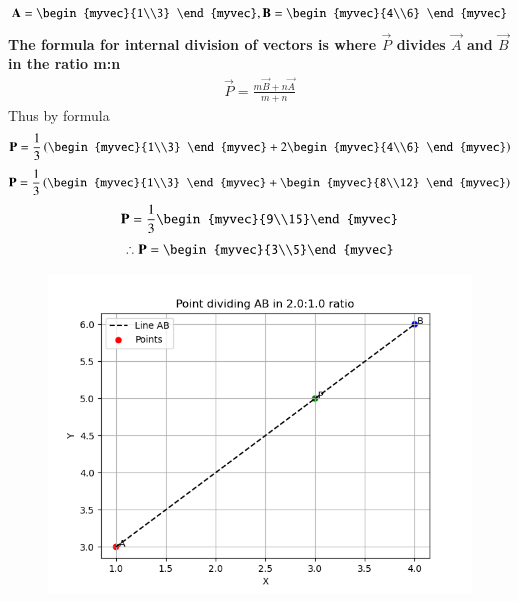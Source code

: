 \documentclass[journal]{IEEEtran}
\begin{document}
	\begin{align*}
		\vec{A} = \begin{myvec}{1\\3} \end{myvec} , \vec{B} = \begin{myvec}{4\\6} \end{myvec}
	\end{align*}
	\textbf{The formula for internal division of vectors is where $\vec{P}$ divides $\vec{A}$ and $\vec{B}$ in the ratio m:n}
	\begin{align*}
	\vec{P} =	\frac{m\vec{B} + n\vec{A}}{m+n} 
	\end{align*}
	Thus by formula
	\begin{align*}
	\vec{P} = \frac{1}{3}\brak{\begin{myvec}{1\\3} \end{myvec}+2\begin{myvec}{4\\6} \end{myvec}}
	\end{align*}
	\begin{align*}
		\vec{P} = \frac{1}{3}\brak{\begin{myvec}{1\\3} \end{myvec}+\begin{myvec}{8\\12} \end{myvec}}
	\end{align*}
	\begin{align*}
		\vec{P} = \frac{1}{3}\begin{myvec}{9\\15}\end{myvec}
	\end{align*}
	\begin{align*}
	\therefore	\vec{P} = \begin{myvec}{3\\5}\end{myvec}
	\end{align*}

\begin{figure}[H]
	\centering
	\includegraphics[width = 0.8\columnwidth]{q1.1.png}
	\caption*{}
	\label{q1.1}
\end{figure}
\end{document}
